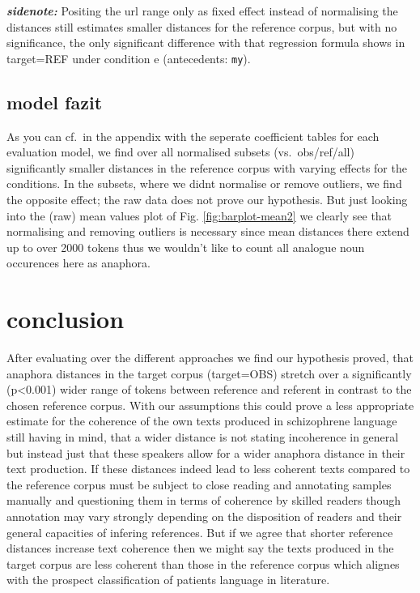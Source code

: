 \documentclass[
  12pt,
  oneside]{book}
\begin{document}
\textbf{\emph{sidenote:}} Positing the url range only as fixed effect instead of normalising the distances still estimates smaller distances for the reference corpus, but with no significance, the only significant difference with that regression formula shows in target=REF under condition e (antecedents: \texttt{my}).

\subsection{model fazit}\label{model-fazit}

As you can cf.~in the appendix with the seperate coefficient tables for each evaluation model, we find over all normalised subsets (vs.~obs/ref/all) significantly smaller distances in the reference corpus with varying effects for the conditions. In the subsets, where we didnt normalise or remove outliers, we find the opposite effect; the raw data does not prove our hypothesis. But just looking into the (raw) mean values plot of Fig. \ref{fig:barplot-mean2} we clearly see that normalising and removing outliers is necessary since mean distances there extend up to over 2000 tokens thus we wouldn't like to count all analogue noun occurences here as anaphora.

\section{conclusion}\label{conclusion}

After evaluating over the different approaches we find our hypothesis proved, that anaphora distances in the target corpus (target=OBS) stretch over a significantly (p\textless0.001) wider range of tokens between reference and referent in contrast to the chosen reference corpus. With our assumptions this could prove a less appropriate estimate for the coherence of the own texts produced in schizophrene language still having in mind, that a wider distance is not stating incoherence in general but instead just that these speakers allow for a wider anaphora distance in their text production. If these distances indeed lead to less coherent texts compared to the reference corpus must be subject to close reading and annotating samples manually and questioning them in terms of coherence by skilled readers though annotation may vary strongly depending on the disposition of readers and their general capacities of infering references. But if we agree that shorter reference distances increase text coherence then we might say the texts produced in the target corpus are less coherent than those in the reference corpus which alignes with the prospect classification of patients language in literature.
\end{document}

